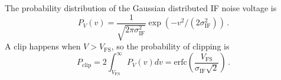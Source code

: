 
The probability distribution of the Gaussian distributed IF noise voltage is
\begin{equation*}
  P_V(v) = \frac{1}{\sqrt{2 \pi \sigma_\text{IF}^2}} \exp\left(-v^2 / (2 \sigma_\text{IF}^2) \right) \, .
\end{equation*}
A clip happens when $V > V_\text{FS}$, so the probability of clipping is
\begin{equation}
  P_\text{clip}
  = 2 \int_{V_\text{FS}}^\infty P_V(v) dv
  = \text{erfc} \left( \frac{V_\text{FS}}{\sigma_\text{IF} \sqrt{2}} \right) \, .
\end{equation}
